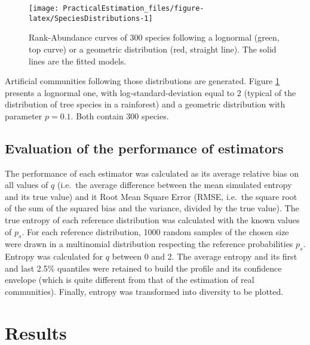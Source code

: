 \documentclass[fleqn,10pt]{latex/stylish_article} %
\begin{document}
\scriptsize

\begin{figure}

{\centering \texttt{[image: PracticalEstimation\_files/figure-latex/SpeciesDistributions-1]} 

}

\caption{Rank-Abundance curves of 300 species following a lognormal (green, top curve) or a geometric distribution (red, straight line). The solid lines are the fitted models.}\label{fig:SpeciesDistributions}
\end{figure}

\normalsize

Artificial communities following those distributions are generated.
Figure \ref{fig:SpeciesDistributions} presents a lognormal one, with log-standard-deviation equal to 2 (typical of the distribution of tree species in a rainforest) and a geometric distribution with parameter \(p=0.1\).
Both contain 300 species.

\hypertarget{evaluation-of-the-performance-of-estimators}{%
\subsection{Evaluation of the performance of estimators}\label{evaluation-of-the-performance-of-estimators}}

The performance of each estimator was calculated as its average relative bias on all values of \(q\) (i.e.~the average difference between the mean simulated entropy and its true value) and it Root Mean Square Error (RMSE, i.e.~the square root of the sum of the squared bias and the variance, divided by the true value).
The true entropy of each reference distribution was calculated with the known values of \(p_s\).
For each reference distribution, 1000 random samples of the chosen size were drawn in a multinomial distribution respecting the reference probabilities \(p_s\).
Entropy was calculated for \(q\) between 0 and 2.
The average entropy and its first and last 2.5\% quantiles were retained to build the profile and its confidence envelope (which is quite different from that of the estimation of real communities).
Finally, entropy was transformed into diversity to be plotted.

\hypertarget{results}{%
\section{Results}\label{results}}
\end{document}
